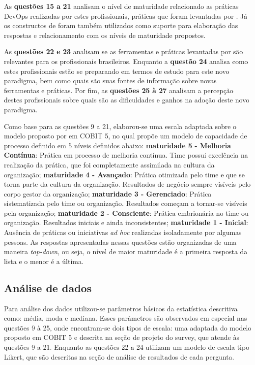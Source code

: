 \documentclass[twoside,english,brazilian]{UNISINOSartigo}
\begin{document}
As \textbf{questões 15 a 21} analisam o nível de maturidade relacionado as práticas DevOps realizadas por estes profissionais, práticas que foram levantadas por . Já os constructos  de  foram também utilizados como suporte para elaboração das respostas e relacionamento com os níveis de maturidade propostos.

As \textbf{questões 22 e 23} analisam se as ferramentas e práticas levantadas por  são relevantes para os profissionais brasileiros.
Enquanto a \textbf{questão 24} analisa como estes profissionais estão se preparando em termos de estudo para este novo paradigma, bem como quais são suas fontes de informação sobre novas ferramentas e práticas. Por fim, as \textbf{questões 25 à 27} analisam a percepção destes profissionais sobre quais são as dificuldades e ganhos na adoção deste novo paradigma.

 Como base para as questões 9 a 21, elaborou-se uma escala adaptada sobre o modelo proposto por  em COBIT 5, no qual propõe um modelo de capacidade de processo definido em 5 níveis definidos abaixo: \textbf{maturidade 5 - Melhoria Contínua}: Prática em processo de melhoria contínua. Time possui excelência na realização da prática, que foi completamente assimilada na cultura da organização; \textbf{maturidade 4 - Avançado}: Prática otimizada pelo time e que se torna parte da cultura da organização. Resultados de negócio sempre visíveis pelo corpo gestor da organização; \textbf{maturidade 3 - Gerenciado}: Prática sistematizada pelo time ou organização. Resultados começam a tornar-se visíveis pela organização; \textbf{maturidade 2 - Consciente}: Prática embrionária no time ou organização. Resultados iniciais e ainda inconsistentes; \textbf{maturidade 1 - Inicial}: Ausência de práticas ou iniciativas \textit{ad hoc} realizadas isoladamente por algumas pessoas. As respostas apresentadas nessas questões estão organizadas de uma maneira \textit{top-down}, ou seja, o nível de maior maturidade é a primeira resposta da lista e o menor é a última.

 \subsection{Análise de dados}
Para análise dos dados utilizou-se parâmetros básicos da estatística descritiva como: média, moda e mediana. Esses parâmetros são observados em especial nas questões 9 à 25, onde encontram-se dois tipos de escala: uma adaptada do modelo proposto em COBIT 5 e descrita na seção de projeto do survey, que atende às questões 9 a 21. Enquanto as questões 22 a 24 utilizam um modelo de escala tipo Likert, que são descritas na seção de análise de resultados de cada pergunta.
\end{document}
